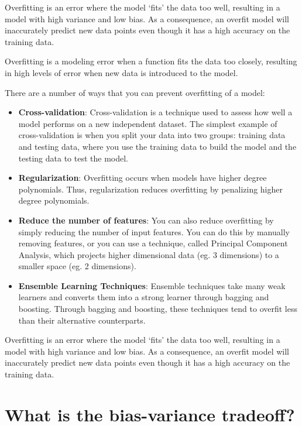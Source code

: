 \documentclass[
]{book}
\begin{document}
Overfitting is an error where the model `fits' the data too well, resulting in a model with high variance and low bias. As a consequence, an overfit model will inaccurately predict new data points even though it has a high accuracy on the training data.

Overfitting is a modeling error when a function fits the data too closely, resulting in high levels of error when new data is introduced to the model.

There are a number of ways that you can prevent overfitting of a model:

\begin{itemize}
\item
  \textbf{Cross-validation}: Cross-validation is a technique used to assess how well a model performs on a new independent dataset. The simplest example of cross-validation is when you split your data into two groups: training data and testing data, where you use the training data to build the model and the testing data to test the model.
\item
  \textbf{Regularization}: Overfitting occurs when models have higher degree polynomials. Thus, regularization reduces overfitting by penalizing higher degree polynomials.
\item
  \textbf{Reduce the number of features}: You can also reduce overfitting by simply reducing the number of input features. You can do this by manually removing features, or you can use a technique, called Principal Component Analysis, which projects higher dimensional data (eg. 3 dimensions) to a smaller space (eg. 2 dimensions).
\item
  \textbf{Ensemble Learning Techniques}: Ensemble techniques take many weak learners and converts them into a strong learner through bagging and boosting. Through bagging and boosting, these techniques tend to overfit less than their alternative counterparts.
\end{itemize}

Overfitting is an error where the model `fits' the data too well, resulting in a model with high variance and low bias. As a consequence, an overfit model will inaccurately predict new data points even though it has a high accuracy on the training data.

\hypertarget{what-is-the-bias-variance-tradeoff}{%
\section{What is the bias-variance tradeoff?}\label{what-is-the-bias-variance-tradeoff}}
\end{document}
